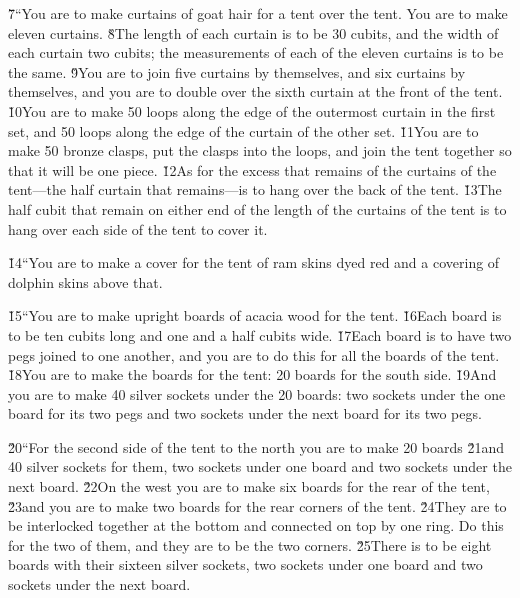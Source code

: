 \v{7}``You are to make curtains of goat hair for a tent over the tent. You are to make eleven curtains. \v{8}The length of each curtain is to be 30 cubits, and the width of each curtain two cubits; the measurements of each of the eleven curtains is to be the same. \v{9}You are to join five curtains by themselves, and six curtains by themselves, and you are to double over the sixth curtain at the front of the tent. \v{10}You are to make 50 loops along the edge of the outermost curtain in the first set, and 50 loops along the edge of the curtain of the other set. \v{11}You are to make 50 bronze clasps, put the clasps into the loops, and join the tent together so that it will be one piece. \v{12}As for the excess that remains of the curtains of the tent---the half curtain that remains---is to hang over the back of the tent. \v{13}The half cubit that remain on either end of the length of the curtains of the tent is to hang over each side of the tent to cover it.

\v{14}``You are to make a cover for the tent of ram skins dyed red and a covering of dolphin skins above that.

\v{15}``You are to make upright boards of acacia wood for the tent. \v{16}Each board is to be ten cubits long and one and a half cubits wide. \v{17}Each board is to have two pegs joined to one another, and you are to do this for all the boards of the tent. \v{18}You are to make the boards for the tent: 20 boards for the south side. \v{19}And you are to make 40 silver sockets under the 20 boards: two sockets under the one board for its two pegs and two sockets under the next board for its two pegs.

\v{20}``For the second side of the tent to the north you are to make 20 boards \v{21}and 40 silver sockets for them, two sockets under one board and two sockets under the next board. \v{22}On the west you are to make six boards for the rear of the tent, \v{23}and you are to make two boards for the rear corners of the tent. \v{24}They are to be interlocked together at the bottom and connected on top by one ring. Do this for the two of them, and they are to be the two corners. \v{25}There is to be eight boards with their sixteen silver sockets, two sockets under one board and two sockets under the next board.


